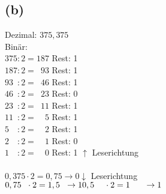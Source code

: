 \documentclass[a4paper,12pt]{article}
\begin{document}
	\subsection*{(b)}
	Dezimal: $375,375$ \\
	Bin\"ar: \\
	$375 : 2 = 187$							Rest: 1 \\
	$187 : 2 =\hspace{6pt} 93$				Rest: 1 \\
	$93\hspace{6pt} : 2 =\hspace{6pt} 46$ 	Rest: 1 \\
	$46\hspace{6pt} : 2 =\hspace{6pt} 23$ 	Rest: 0 \\
	$23\hspace{6pt} : 2 =\hspace{6pt} 11$ 	Rest: 1 \\
	$11\hspace{6pt} : 2 =\hspace{12pt} 5$ 	Rest: 1 \\
	$5\hspace{12pt} : 2 = \hspace{12pt}2$ 	Rest: 1 \\
	$2\hspace{12pt} : 2 = \hspace{12pt}1$ 	Rest: 0 \\
	$1\hspace{12pt} : 2 = \hspace{12pt}0$ 	Rest: 1 $\uparrow$ Leserichtung \\
	\\
	$0,375 \cdot 2 = 0,75 \to 0 \downarrow$ Leserichtung\\
	$0,75 \hspace{6pt}\cdot 2 = 1,5 \hspace{6pt}\to 1 \\
	0,5 \hspace{12pt}\cdot 2 = 1 \hspace{17pt}\to 1$ \\
\end{document}
